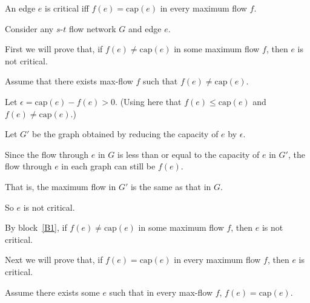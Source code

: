 \documentclass[10pt]{article}
\begin{document}
\begin{problems}

  \problem
  
  \setcounter{lemma}{1}
  \begin{lemma}
    An edge $e$ is critical iff $f(e) = \text{cap}(e)$ in every maximum flow $f$.
  \end{lemma}

  \begin{longFormProof}

    \begin{block}[B]
      {Consider any $s$-$t$ flow network $G$ and edge $e$.

      \lineacross }
      
      \step First we will prove that, if $f(e) \ne \text{cap}(e)$ in some maximum flow $f$, then $e$ is not critical.

      \smallskip 
      
      \begin{block}[B1]
        {Assume that there exists max-flow $f$ such that $f(e) \ne \text{cap}(e)$.}

        \step Let $\epsilon = \text{cap}(e) - f(e) > 0$.  (Using here that $f(e) \le \text{cap}(e)$ and $f(e)\ne\text{cap}(e)$.)

        \step Let $G'$ be the graph obtained by reducing the capacity of $e$ by $\epsilon$.

        \step Since the flow through $e$ in $G$ is less than or equal to the capacity of $e$ in $G'$, 
              the flow through $e$ in each graph can still be $f(e)$.

        \step That is, the maximum flow in $G'$ is the same as that in $G$.

        \step So $e$ is not critical.
      \end{block}

      \step[B2] By block~\ref{B1}, if $f(e) \ne \text{cap}(e)$ in some maximum flow $f$,
      then $e$ is not critical.

      \smallskip 

      \lineacross 

      \step Next we will prove that, if $f(e) = \text{cap}(e)$ in every maximum flow $f$, then $e$ is critical.

      \smallskip 
      
      \begin{block}[B3]
        {Assume there exists some $e$ such that in every max-flow $f$,  $f(e) = \text{cap}(e)$.}


\end{block}
\end{block}
\end{longFormProof}
\end{problems}
\end{document}
